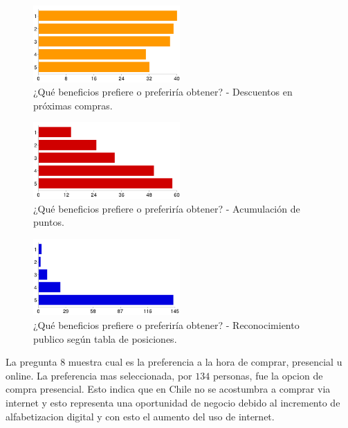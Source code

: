 \begin{figure}[!htb]
  \centering
  \includegraphics[width=0.5\textwidth]{images/chartPreg7_2.png}
  \caption[chart7-2]{¿Qué beneficios prefiere o preferiría obtener? - Descuentos en próximas compras.}
  \label{fig:chart2}
\end{figure}

\begin{figure}[!htb]
  \centering
  \includegraphics[width=0.5\textwidth]{images/chartPreg7_3.png}
  \caption[chart7-3]{¿Qué beneficios prefiere o preferiría obtener? - Acumulación de puntos.}
  \label{fig:chart2}
\end{figure}

\begin{figure}[!htb]
  \centering
  \includegraphics[width=0.5\textwidth]{images/chartPreg7_1.png}
  \caption[chart7-4]{¿Qué beneficios prefiere o preferiría obtener? - Reconocimiento publico según tabla de posiciones.}
  \label{fig:chart2}
\end{figure}

La pregunta $8$ muestra cual es la preferencia a la hora de comprar, presencial u online. La preferencia
mas seleccionada, por $134$ personas, fue la opcion de compra presencial. Esto indica que en Chile
no se acostumbra a comprar via internet y esto representa una oportunidad de negocio debido al
incremento de alfabetizacion digital y con esto el aumento del uso de internet.


